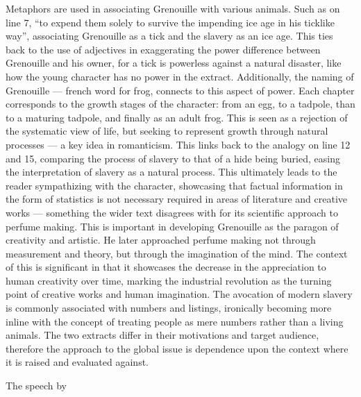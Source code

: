 \documentclass[a4paper,12pt]{article}
\begin{document}
Metaphors are used in associating Grenouille with various animals. Such as on line 7, ``to expend them solely to survive the impending ice age in his ticklike way'', associating Grenouille as a tick and the slavery as an ice age. This ties back to the use of adjectives in exaggerating the power difference between Grenouille and his owner, for a tick is powerless against a natural disaster, like how the young character has no power in the extract. Additionally, the naming of Grenouille --- french word for frog, connects to this aspect of power. Each chapter corresponds to the growth stages of the character: from an egg, to a tadpole, than to a maturing tadpole, and finally as an adult frog. This is seen as a rejection of the systematic view of life, but seeking to represent growth through natural processes --- a key idea in romanticism. This links back to the analogy on line 12 and 15, comparing the process of slavery to that of a hide being buried, easing the interpretation of slavery as a natural process. This ultimately leads to the reader sympathizing with the character, showcasing that factual information in the form of statistics is not necessary required in areas of literature and creative works --- something the wider text disagrees with for its scientific approach to perfume making.
This is important in developing Grenouille as the paragon of creativity and artistic. He later approached perfume making not through measurement and theory, but through the imagination of the mind. The context of this is significant in that it showcases the decrease in the appreciation to human creativity over time, marking the industrial revolution as the turning point of creative works and human imagination. The avocation of modern slavery is commonly associated with numbers and listings, ironically becoming more inline with the concept of treating people as mere numbers rather than a living animals.
The two extracts differ in their motivations and target audience, therefore the approach to the global issue is dependence upon the context where it is raised and evaluated against.

The speech by


\end{document}
